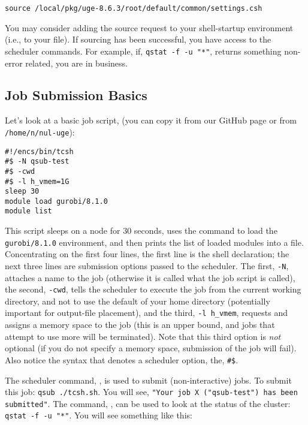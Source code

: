 \documentclass{easychair}
\begin{document}
\begin{verbatim}
source /local/pkg/uge-8.6.3/root/default/common/settings.csh 
\end{verbatim}

You may consider adding the source request to your shell-startup environment (i.e., to your  file). If sourcing has been successful, you have access to the scheduler commands. For example, if, \texttt{qstat -f -u "*"}, returns something non-error related, you are in business. 

\subsection{Job Submission Basics}

Let's look at a basic job script,  (you can copy it from our GitHub page or from \texttt{/home/n/nul-uge}):

\begin{verbatim}
#!/encs/bin/tcsh 
#$ -N qsub-test 
#$ -cwd 
#$ -l h_vmem=1G 
sleep 30 
module load gurobi/8.1.0 
module list 
\end{verbatim}

This script sleeps on a node for 30 seconds, uses the  command to load the \texttt{gurobi/8.1.0} environment, and then prints the list of loaded modules into a file.  Concentrating on the first four lines, the first line is the shell declaration; the next three lines are submission options passed to the scheduler. The first, \texttt{-N}, attaches a name to the job (otherwise it is called what the job script is called), the second, \texttt{-cwd}, tells  the scheduler to execute the job from the current working directory, and not to use the default of your home directory (potentially important for output-file placement), and the third, \texttt{-l h\_vmem}, requests and assigns a memory space to the job (this is an upper  bound, and jobs that attempt to use more will be terminated). Note that this third option 
is \emph{not} optional (if you do not specify a memory space, submission of the job will fail).  Also notice the syntax that denotes a scheduler option, the, \verb+#$+. 

The scheduler command, , is used to submit (non-interactive) jobs. To submit this job: \texttt{qsub ./tcsh.sh}. You will see, \texttt{"Your job X ("qsub-test") has been submitted"}. The  command, , can be used to look at the status of the cluster: \texttt{qstat -f -u "*"}. You will  see something like this: 
\end{document}
